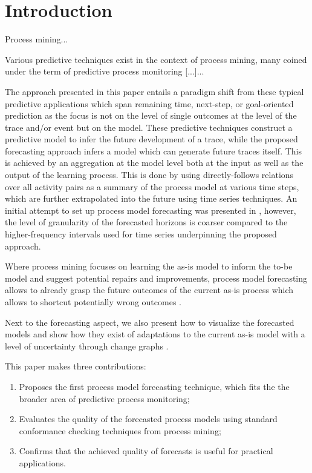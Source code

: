 \section{Introduction}\label{sec:introduction}

Process mining...

Various predictive techniques exist in the context of process mining, many coined under the term of predictive process monitoring [\cite{DBLP:conf/caise/TaxVRD17,DBLP:journals/tkdd/TeinemaaDRM19}...]...


The approach presented in this paper entails a paradigm shift from these typical predictive applications which span remaining time, next-step, or goal-oriented prediction \cite{DBLP:conf/bpm/Francescomarino18} as the focus is not on the level of single outcomes at the level of the trace and/or event but on the model.
These predictive techniques construct a predictive model to infer the future development of a trace, while the proposed forecasting approach infers a model which can generate future traces itself.
This is achieved by an aggregation at the model level both at the input as well as the output of the learning process.
This is done by using directly-follows relations over all activity pairs as a summary of the process model at various time steps, which are further extrapolated into the future using time series techniques.
An initial attempt to set up process model forecasting was presented in \cite{de2020predictive}, however, the level of granularity of the forecasted horizons is coarser compared to the higher-frequency intervals used for time series underpinning the proposed approach.

Where process mining focuses on learning the as-is model to inform the to-be model and suggest potential repairs and improvements, process model forecasting allows to already grasp the future outcomes of the current as-is process which allows to shortcut potentially wrong outcomes \cite{DBLP:conf/bpm/PollPRRR18}.

Next to the forecasting aspect, we also present how to visualize the forecasted models and show how they exist of adaptations to the current as-is model with a level of uncertainty through change graphs \cite{DBLP:conf/er/KabicherKR11}.

This paper makes three contributions:
\begin{enumerate}
	\item Proposes the first process model forecasting technique, which fits the the broader area of predictive process monitoring;
	\item Evaluates the quality of the forecasted process models using standard conformance checking techniques from process mining;
	\item Confirms that the achieved quality of forecasts is useful for practical applications.
\end{enumerate}

